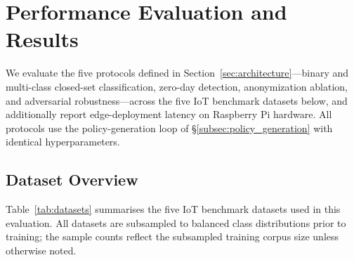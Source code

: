 \section{Performance Evaluation and Results}
\label{sec:resultsAndDisc}

We evaluate the five protocols defined in Section~\ref{sec:architecture}---binary and multi-class closed-set classification, zero-day detection, anonymization ablation, and adversarial robustness---across the five IoT benchmark datasets below, and additionally report edge-deployment latency on Raspberry Pi hardware. All protocols use the policy-generation loop of \S\ref{subsec:policy_generation} with identical hyperparameters.

\subsection{Dataset Overview}\label{subsec:datasets}

Table~\ref{tab:datasets} summarises the five IoT benchmark datasets used in this evaluation. All datasets are subsampled to balanced class distributions
prior to training; the sample counts reflect the subsampled training corpus
size unless otherwise noted.

